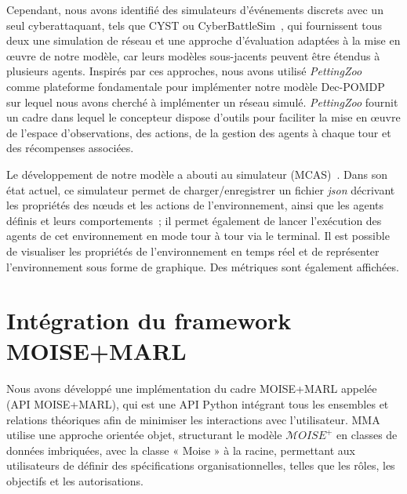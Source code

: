 Cependant, nous avons identifié des simulateurs d'événements discrets avec un seul cyberattaquant, tels que CYST\cite{drasar_session-level_2020} ou CyberBattleSim~\cite{cyberbattlesim}, qui fournissent tous deux une simulation de réseau et une approche d'évaluation adaptées à la mise en œuvre de notre modèle, car leurs modèles sous-jacents peuvent être étendus à plusieurs agents. Inspirés par ces approches, nous avons utilisé \textit{PettingZoo}~\cite{terry2020pettingzoo} comme plateforme fondamentale pour implémenter notre modèle Dec-POMDP sur lequel nous avons cherché à implémenter un réseau simulé. \textit{PettingZoo} fournit un cadre dans lequel le concepteur dispose d'outils pour faciliter la mise en œuvre de l'espace d'observations, des actions, de la gestion des agents à chaque tour et des récompenses associées.


Le développement de notre modèle a abouti au simulateur  (MCAS)~\cite{MCASWebsite}. Dans son état actuel, ce simulateur permet de charger/enregistrer un fichier \textit{json} décrivant les propriétés des nœuds et les actions de l'environnement, ainsi que les agents définis et leurs comportements~; il permet également de lancer l'exécution des agents de cet environnement en mode tour à tour via le terminal. Il est possible de visualiser les propriétés de l'environnement en temps réel et de représenter l'environnement sous forme de graphique. Des métriques sont également affichées.



\section{Intégration du framework MOISE+MARL}

Nous avons développé une implémentation du cadre MOISE+MARL appelée ~\hyperref[fn:github]{\footnotemark[2]} (API MOISE+MARL), qui est une API Python intégrant tous les ensembles et relations théoriques afin de minimiser les interactions avec l'utilisateur. MMA utilise une approche orientée objet, structurant le modèle $\mathcal{M}OISE^+$ en classes de données imbriquées, avec la classe « Moise » à la racine, permettant aux utilisateurs de définir des spécifications organisationnelles, telles que les rôles, les objectifs et les autorisations.

